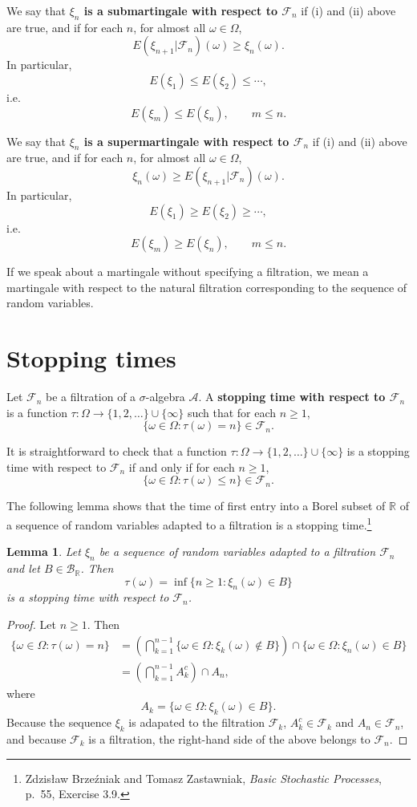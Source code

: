 \documentclass{article}
\newtheorem{lemma}[theorem]{Lemma}
\theoremstyle{definition}
\begin{document}
We say that \textbf{$\xi_n$ is a submartingale with respect to $\mathscr{F}_n$} if (i) and (ii) above are true, and if
for each $n$, for almost all $\omega \in \Omega$,
\[
E(\xi_{n+1}|\mathscr{F}_n)(\omega) \geq \xi_n(\omega).
\]
In particular,
\[
E(\xi_1) \leq E(\xi_2) \leq \cdots,
\]
i.e.
\[
E(\xi_m) \leq E(\xi_n), \qquad m \leq n.
\]

We say that 
\textbf{$\xi_n$ is a supermartingale with respect to $\mathscr{F}_n$} if (i) and (ii) above are true, and if
for each $n$, for almost all $\omega \in \Omega$,
\[
\xi_n(\omega) \geq E(\xi_{n+1}|\mathscr{F}_n)(\omega).
\]
In particular,
\[
E(\xi_1) \geq E(\xi_2) \geq \cdots,
\]
i.e.
\[
E(\xi_m) \geq E(\xi_n), \qquad m \leq n.
\]

If we speak about a martingale without specifying a filtration, we mean a martingale with respect to the natural filtration
corresponding to the sequence of random variables.


\section{Stopping times}
Let $\mathscr{F}_n$ be a filtration of a $\sigma$-algebra $\mathscr{A}$. A \textbf{stopping time with respect to $\mathscr{F}_n$} is a 
function $\tau:\Omega \to \{1,2,\ldots\} \cup \{\infty\}$ such that for each $n \geq 1$,
\[
\{\omega \in \Omega: \tau(\omega) = n\} \in \mathscr{F}_n.
\]

It is straightforward to check that a function $\tau:\Omega \to \{1,2,\ldots\} \cup \{\infty\}$ is a stopping time with respect to $\mathscr{F}_n$ if and only if
for each $n \geq 1$,
\[
\{\omega \in \Omega: \tau(\omega) \leq n\} \in \mathscr{F}_n.
\]

The following lemma shows that the time of first entry into a Borel subset of $\mathbb{R}$ of a sequence of random variables adapted to a filtration
is a stopping time.\footnote{Zdzis\l{}aw Brze\'zniak and Tomasz Zastawniak, {\em Basic Stochastic Processes}, p.~55, Exercise 3.9.}

\begin{lemma}
Let $\xi_n$ be a sequence of random variables adapted to a filtration $\mathscr{F}_n$ and let $B \in \mathscr{B}_{\mathbb{R}}$. Then
\[
\tau(\omega) = \inf\{n \geq 1: \xi_n(\omega) \in B\}
\]
is a stopping time with respect to $\mathscr{F}_n$. 
\label{hitting}
\end{lemma}
\begin{proof}
Let $n \geq 1$. Then 
\begin{align*}
\{\omega \in \Omega: \tau(\omega) =n\} &= \left( \bigcap_{k=1}^{n-1} \{\omega \in \Omega: \xi_k(\omega) \not \in B\}\right)
\cap \{\omega \in \Omega: \xi_n(\omega) \in B\}\\
&=\left(\bigcap_{k=1}^{n-1} A_k^c \right) \cap A_n,
\end{align*}
where
\[
A_k = \{\omega \in \Omega: \xi_k(\omega) \in B\}.
\]
Because the sequence $\xi_k$ is adapated to the filtration $\mathscr{F}_k$,
$A_k^c \in \mathscr{F}_k$ and $A_n \in \mathscr{F}_n$, and because
$\mathscr{F}_k$ is a filtration, 
the right-hand side of the above belongs to $\mathscr{F}_n$.
\end{proof}
\end{document}
